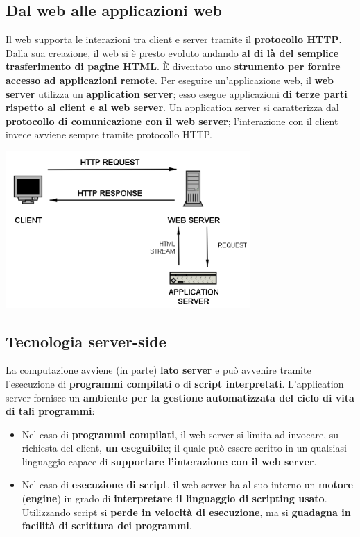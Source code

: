 \documentclass[12pt]{article}
\begin{document}
\subsection{Dal web alle applicazioni web}
Il web supporta le interazioni tra client e server tramite il \textbf{protocollo HTTP}. Dalla sua creazione, il web si è presto evoluto andando \textbf{al di là del semplice trasferimento di pagine HTML}.
È diventato uno \textbf{strumento per fornire accesso ad applicazioni remote}. Per eseguire un'applicazione web, il \textbf{web server} utilizza un \textbf{application server}; esso esegue applicazioni \textbf{di terze parti rispetto al client e al web server}.
Un application server si caratterizza dal \textbf{protocollo di comunicazione con il web server}; l'interazione con il client invece avviene sempre tramite protocollo HTTP.
\begin{center}
    \includegraphics[width = 0.70\textwidth]{Images/175.png}
\end{center}
\subsection{Tecnologia server-side}
La computazione avviene (in parte) \textbf{lato server} e può avvenire tramite l'esecuzione di \textbf{programmi compilati} o di \textbf{script interpretati}.
L'application server fornisce un \textbf{ambiente per la gestione automatizzata del ciclo di vita di tali programmi}:
\begin{itemize}
    \item Nel caso di \textbf{programmi compilati}, il web server si limita ad invocare, su richiesta del client, \textbf{un eseguibile}; il quale può essere scritto in un qualsiasi linguaggio capace di \textbf{supportare l'interazione con il web server}.
    \item Nel caso di \textbf{esecuzione di script}, il web server ha al suo interno un \textbf{motore} (\textbf{engine}) in grado di \textbf{interpretare il linguaggio di scripting usato}. Utilizzando script si \textbf{perde in velocità di esecuzione}, ma si \textbf{guadagna in facilità di scrittura dei programmi}.
\end{itemize}
\end{document}
